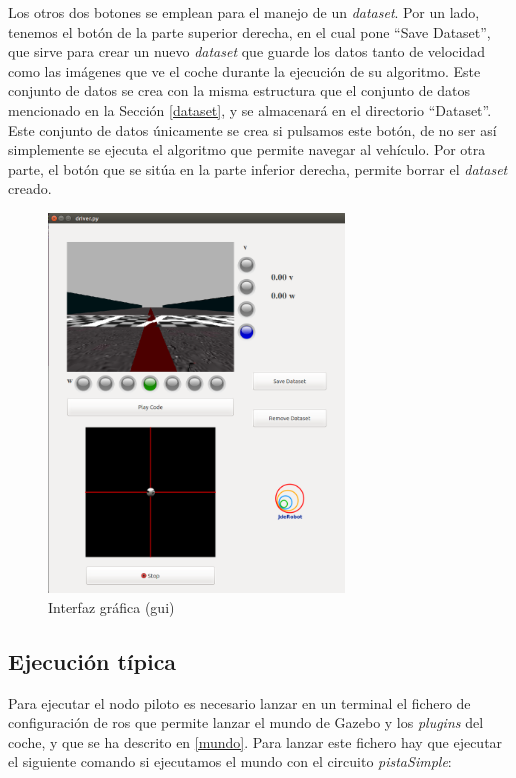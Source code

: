 Los otros dos botones se emplean para el manejo de un \textit{dataset}. Por un lado, tenemos el botón de la parte superior derecha, en el cual pone ``Save Dataset'', que sirve para crear un nuevo \textit{dataset} que guarde los datos tanto de velocidad como las imágenes que ve el coche durante la ejecución de su algoritmo. Este conjunto de datos se crea con la misma estructura que el conjunto de datos mencionado en la Sección \ref{dataset}, y se almacenará en el directorio ``Dataset''. Este conjunto de datos únicamente se crea si pulsamos este botón, de no ser así simplemente se ejecuta el algoritmo que permite navegar al vehículo. Por otra parte, el botón que se sitúa en la parte inferior derecha, permite borrar el \textit{dataset} creado.\\

\begin{figure}
  \begin{center}
    \includegraphics[width=0.7\textwidth]{figures/Infraestructura/gui.png}
		\caption{Interfaz gráfica (\acrshort{gui})}
		\label{fig.gui}
		\end{center}
\end{figure}


\subsection{Ejecución típica}

Para ejecutar el nodo piloto es necesario lanzar en un terminal el fichero de configuración de \acrshort{ros} que permite lanzar el mundo de Gazebo y los \textit{plugins} del coche, y que se ha descrito en \ref{mundo}. Para lanzar este fichero hay que ejecutar el siguiente comando si ejecutamos el mundo con el circuito \textit{pistaSimple}:\\

